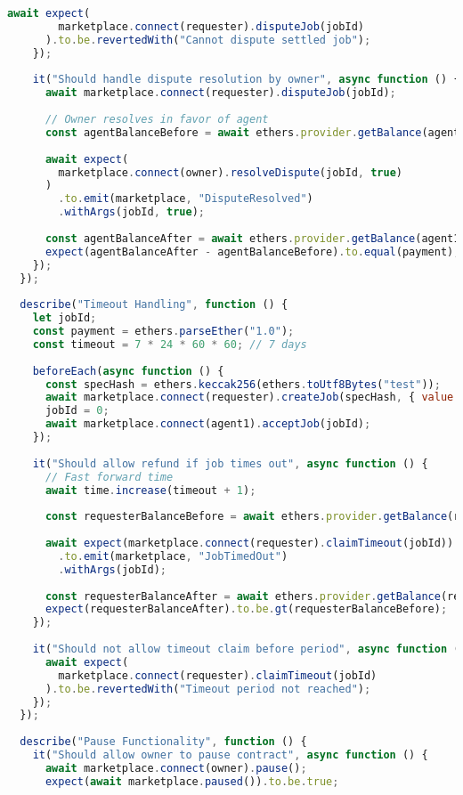 \begin{lstlisting}[language=JavaScript,caption={Complete test suite for smart contracts}]
      await expect(
        marketplace.connect(requester).disputeJob(jobId)
      ).to.be.revertedWith("Cannot dispute settled job");
    });
    
    it("Should handle dispute resolution by owner", async function () {
      await marketplace.connect(requester).disputeJob(jobId);
      
      // Owner resolves in favor of agent
      const agentBalanceBefore = await ethers.provider.getBalance(agent1.address);
      
      await expect(
        marketplace.connect(owner).resolveDispute(jobId, true)
      )
        .to.emit(marketplace, "DisputeResolved")
        .withArgs(jobId, true);
      
      const agentBalanceAfter = await ethers.provider.getBalance(agent1.address);
      expect(agentBalanceAfter - agentBalanceBefore).to.equal(payment);
    });
  });
  
  describe("Timeout Handling", function () {
    let jobId;
    const payment = ethers.parseEther("1.0");
    const timeout = 7 * 24 * 60 * 60; // 7 days
    
    beforeEach(async function () {
      const specHash = ethers.keccak256(ethers.toUtf8Bytes("test"));
      await marketplace.connect(requester).createJob(specHash, { value: payment });
      jobId = 0;
      await marketplace.connect(agent1).acceptJob(jobId);
    });
    
    it("Should allow refund if job times out", async function () {
      // Fast forward time
      await time.increase(timeout + 1);
      
      const requesterBalanceBefore = await ethers.provider.getBalance(requester.address);
      
      await expect(marketplace.connect(requester).claimTimeout(jobId))
        .to.emit(marketplace, "JobTimedOut")
        .withArgs(jobId);
      
      const requesterBalanceAfter = await ethers.provider.getBalance(requester.address);
      expect(requesterBalanceAfter).to.be.gt(requesterBalanceBefore);
    });
    
    it("Should not allow timeout claim before period", async function () {
      await expect(
        marketplace.connect(requester).claimTimeout(jobId)
      ).to.be.revertedWith("Timeout period not reached");
    });
  });
  
  describe("Pause Functionality", function () {
    it("Should allow owner to pause contract", async function () {
      await marketplace.connect(owner).pause();
      expect(await marketplace.paused()).to.be.true;
      

\end{lstlisting}
